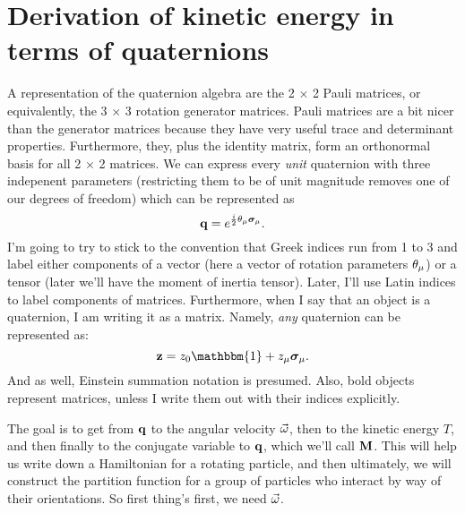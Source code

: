 \documentclass[12pt]{article}
\begin{document}
\section{Derivation of kinetic energy in terms of quaternions}
A representation of the quaternion algebra are the 2 $\times$ 2 Pauli matrices, 
or equivalently, the 3 $\times$ 3 rotation generator matrices. Pauli matrices 
are a bit nicer than the generator matrices because they have very useful trace 
and determinant properties. Furthermore, they, plus the identity matrix, form 
an orthonormal basis for all 2 $\times$ 2 matrices. We can express every 
\emph{unit} quaternion with three indepenent parameters (restricting them to be 
of unit magnitude removes one of our degrees of freedom) which can be 
represented as
\[ \mathbf{q} = e^{\frac{i}{2}\theta_\mu \bm{\sigma}_\mu}.\]
I'm going to try to stick to the convention that Greek indices run from 1 to 3 
and label either components of a vector (here a vector of rotation parameters 
$\theta_\mu$) or a tensor (later we'll have the moment of inertia tensor). Later, 
I'll use Latin indices to label components of matrices. Furthermore, when I say 
that an object is a quaternion, I am writing it as a matrix. Namely, \emph{any} 
quaternion can be represented as:
\[ \bv{z} = z_0 \mathbbm{1} + z_\mu \Sig_\mu.\]
And as well, Einstein summation notation is presumed. Also, bold objects 
represent matrices, unless I write them out with their indices explicitly.

The goal is to get from $\mathbf{q}$ to the angular velocity $\vec{\omega}$, then to the 
kinetic energy $T$, and then finally to the conjugate variable to $\mathbf{q}$, 
which we'll call $\mathbf{M}$. This will help us write down a Hamiltonian for a 
rotating particle, and then ultimately, we will construct the partition 
function for a group of particles who interact by way of their orientations. So 
first thing's first, we need $\vec{\omega}$.
\end{document}
